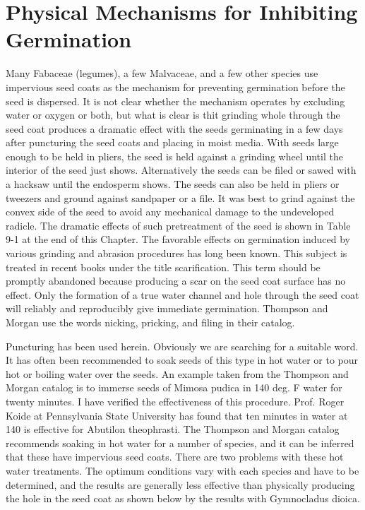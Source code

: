 \chapter[Physical Mechanisms]{Physical Mechanisms for Inhibiting Germination}

Many Fabaceae (legumes), a few Malvaceae, and a few other species use
impervious seed coats as the mechanism for preventing germination before the seed
is dispersed. It is not clear whether the mechanism operates by excluding water or
oxygen or both, but what is clear is thit grinding whole through the seed coat
produces a dramatic effect with the seeds germinating in a few days after puncturing
the seed coats and placing in moist media. With seeds large enough to be held in
pliers, the seed is held against a grinding wheel until the interior of the seed just
shows. Alternatively the seeds can be filed or sawed with a hacksaw until the
endosperm shows. The seeds can also be held in pliers or tweezers and ground
against sandpaper or a file. It was best to grind against the convex side of the seed to
avoid any mechanical damage to the undeveloped radicle. The dramatic effects of
such pretreatment of the seed is shown in Table 9-1 at the end of this Chapter.
The favorable effects on germination induced by various grinding and abrasion
procedures has long been known. This subject is treated in recent books under the
title scarification. This term should be promptly abandoned because producing a scar
on the seed coat surface has no effect. Only the formation of a true water channel and
hole through the seed coat will reliably and reproducibly give immediate germination.
Thompson and Morgan use the words nicking, pricking, and filing in their catalog.

Puncturing has been used herein. Obviously we are searching for a suitable word.
It has often been recommended to soak seeds of this type in hot water or to pour
hot or boiling water over the seeds. An example taken from the Thompson and
Morgan catalog is to immerse seeds of Mimosa pudica in 140 deg. F water for twenty
minutes. I have verified the effectiveness of this procedure. Prof. Roger Koide at
Pennsylvania State University has found that ten minutes in water at 140 is effective
for Abutilon theophrasti. The Thompson and Morgan catalog recommends soaking in
hot water for a number of species, and it can be inferred that these have impervious
seed coats. There are two problems with these hot water treatments. The optimum
conditions vary with each species and have to be determined, and the results are
generally less effective than physically producing the hole in the seed coat as shown
below by the results with Gymnocladus dioica.

